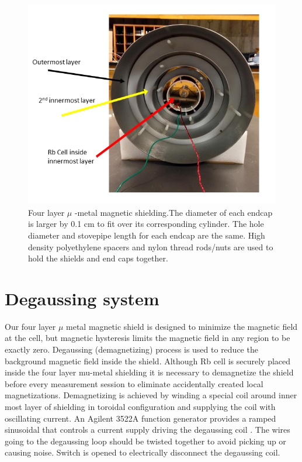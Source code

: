 \begin{figure}[h]
\centering
\includegraphics[width=1.0\linewidth]{figures/magnetic_shielding}
 \caption{Four layer $\mu$ -metal magnetic shielding.The diameter of each endcap is larger by 0.1 cm to fit over its corresponding cylinder. The hole diameter and stovepipe length for each endcap are the same. High density polyethylene spacers and nylon thread rods/nuts are used to hold the shields and end caps together.}
\end{figure}

\section{Degaussing system\label{sec:Degaussing}}
Our four layer $\mu$ metal magnetic shield is designed to minimize the magnetic field at the cell, but
magnetic hysteresis limits the magnetic field in any region to be exactly zero. Degaussing (demagnetizing) process is used to reduce the background magnetic field inside the shield. Although Rb cell is securely placed inside the four layer mu-metal shielding it is necessary to demagnetize the shield before every measurement session  to eliminate accidentally created local magnetizations.
Demagnetizing is achieved by winding a special coil around inner most layer of shielding  in toroidal configuration
and supplying the coil with oscillating current. An Agilent 3522A function generator  provides a ramped sinusoidal that controls a current supply driving the degaussing coil \cite{Martin:2014foa}. The wires going to the degaussing loop should be twisted together to avoid picking up or causing noise. Switch is opened to electrically disconnect the degaussing coil.
 
